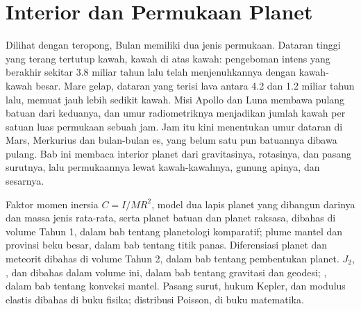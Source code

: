 \chapter{Interior dan Permukaan Planet}\label{ch:b3:planetary-interiors-surfaces}

Dilihat dengan teropong, Bulan memiliki dua jenis permukaan. Dataran tinggi yang
terang tertutup kawah, kawah di atas kawah: pengeboman intens yang berakhir
sekitar 3.8 miliar tahun lalu telah menjenuhkannya dengan kawah-kawah besar.
Mare gelap, dataran yang terisi lava antara 4.2 dan 1.2
miliar tahun lalu, memuat jauh lebih sedikit kawah. Misi Apollo dan Luna
membawa pulang batuan dari keduanya, dan umur radiometriknya menjadikan
jumlah kawah per satuan luas permukaan sebuah jam. Jam itu kini menentukan umur
dataran di Mars, Merkurius dan bulan-bulan es, yang belum satu pun batuannya
dibawa pulang. Bab ini membaca interior planet dari gravitasinya, rotasinya,
dan pasang surutnya, lalu permukaannya lewat kawah-kawahnya,
gunung apinya, dan sesarnya.

\begin{recall}
Faktor momen inersia $C = I/MR^2$, model dua lapis planet yang dibangun darinya
dan massa jenis rata-rata, serta planet batuan dan planet raksasa, dibahas di
volume Tahun 1, dalam bab tentang
planetologi komparatif; plume mantel dan provinsi beku besar, dalam bab tentang
titik panas. Diferensiasi planet dan meteorit dibahas di volume Tahun 2,
dalam bab tentang pembentukan planet. 
$J_2$, , dan  dibahas dalam
volume ini, dalam bab tentang gravitasi dan geodesi; , dalam
bab tentang konveksi mantel. Pasang surut, hukum Kepler, dan modulus elastis
dibahas di buku fisika; distribusi Poisson, di buku
matematika.
\end{recall}

